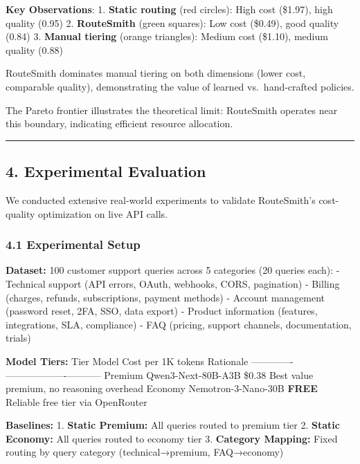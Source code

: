 \documentclass[
  11pt,
]{article}
\begin{document}
\textbf{Key Observations}: 1. \textbf{Static routing} (red circles):
High cost (\$1.97), high quality (0.95) 2. \textbf{RouteSmith} (green
squares): Low cost (\$0.49), good quality (0.84) 3. \textbf{Manual
tiering} (orange triangles): Medium cost (\$1.10), medium quality (0.88)

RouteSmith dominates manual tiering on both dimensions (lower cost,
comparable quality), demonstrating the value of learned vs.~hand-crafted
policies.

The Pareto frontier illustrates the theoretical limit: RouteSmith
operates near this boundary, indicating efficient resource allocation.

\begin{center}\rule{0.5\linewidth}{0.5pt}\end{center}

\hypertarget{experimental-evaluation}{%
\subsection{4. Experimental Evaluation}\label{experimental-evaluation}}

We conducted extensive real-world experiments to validate RouteSmith's
cost-quality optimization on live API calls.

\hypertarget{experimental-setup-1}{%
\subsubsection{4.1 Experimental Setup}\label{experimental-setup-1}}

\textbf{Dataset:} 100 customer support queries across 5 categories (20
queries each): - Technical support (API errors, OAuth, webhooks, CORS,
pagination) - Billing (charges, refunds, subscriptions, payment methods)
- Account management (password reset, 2FA, SSO, data export) - Product
information (features, integrations, SLA, compliance) - FAQ (pricing,
support channels, documentation, trials)

\textbf{Model Tiers:} \textbar{} Tier \textbar{} Model \textbar{} Cost
per 1K tokens \textbar{} Rationale \textbar{}
\textbar------\textbar-------\textbar-------------------\textbar-----------\textbar{}
\textbar{} Premium \textbar{} Qwen3-Next-80B-A3B \textbar{} \$0.38
\textbar{} Best value premium, no reasoning overhead \textbar{}
\textbar{} Economy \textbar{} Nemotron-3-Nano-30B \textbar{}
\textbf{FREE} \textbar{} Reliable free tier via OpenRouter \textbar{}

\textbf{Baselines:} 1. \textbf{Static Premium:} All queries routed to
premium tier 2. \textbf{Static Economy:} All queries routed to economy
tier 3. \textbf{Category Mapping:} Fixed routing by query category
(technical→premium, FAQ→economy)
\end{document}
